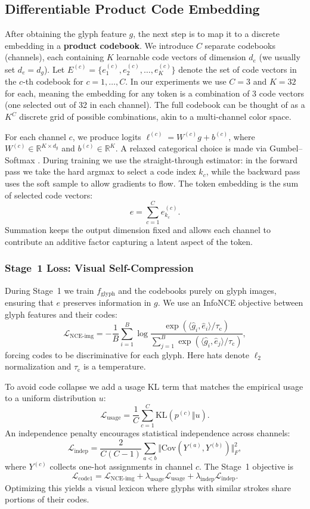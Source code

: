 \documentclass[10pt,twocolumn]{article}
\begin{document}
\subsection{Differentiable Product Code Embedding}\label{sec:product}
After obtaining the glyph feature $g$, the next step is to map it to a discrete embedding in a \textbf{product codebook}. We introduce $C$ separate codebooks (channels), each containing $K$ learnable code vectors of dimension $d_e$ (we usually set $d_e = d_g$). Let $E^{(c)} = \{e^{(c)}_{1}, e^{(c)}_{2}, \dots, e^{(c)}_{K}\}$ denote the set of code vectors in the $c$-th codebook for $c=1,\dots,C$. In our experiments we use $C=3$ and $K=32$ for each, meaning the embedding for any token is a combination of 3 code vectors (one selected out of 32 in each channel). The full codebook can be thought of as a $K^C$ discrete grid of possible combinations, akin to a multi-channel color space.

For each channel $c$, we produce logits $\ell^{(c)} = W^{(c)} g + b^{(c)}$, where $W^{(c)} \in \mathbb{R}^{K \times d_g}$ and $b^{(c)}\in\mathbb{R}^K$. A relaxed categorical choice is made via Gumbel--Softmax \citep{jang2017gumbel}. During training we use the straight-through estimator: in the forward pass we take the hard argmax to select a code index $k_c$, while the backward pass uses the soft sample to allow gradients to flow. The token embedding is the sum of selected code vectors:
\[
    e = \sum_{c=1}^C e^{(c)}_{k_c}.
\]
Summation keeps the output dimension fixed and allows each channel to contribute an additive factor capturing a latent aspect of the token.

\subsubsection{Stage~1 Loss: Visual Self-Compression}
During Stage~1 we train $f_{\text{glyph}}$ and the codebooks purely on glyph images, ensuring that $e$ preserves information in $g$. We use an InfoNCE objective between glyph features and their codes:
\[
    \mathcal{L}_{\text{NCE-img}} = -\frac{1}{B}\sum_{i=1}^B \log \frac{\exp(\langle \hat g_i, \hat e_i\rangle / \tau_{\text{c}})}{\sum_{j=1}^B \exp(\langle \hat g_i, \hat e_j\rangle / \tau_{\text{c}})},
\]
forcing codes to be discriminative for each glyph. Here hats denote $\ell_2$ normalization and $\tau_{\text{c}}$ is a temperature.

To avoid code collapse we add a usage KL term that matches the empirical usage to a uniform distribution $u$:
\[
    \mathcal{L}_{\text{usage}} = \frac{1}{C}\sum_{c=1}^C \mathrm{KL}(p^{(c)} \Vert u).
\]
An independence penalty encourages statistical independence across channels:
\[
    \mathcal{L}_{\text{indep}} = \frac{2}{C(C-1)}\sum_{a<b} \Vert \mathrm{Cov}(Y^{(a)}, Y^{(b)})\Vert_F^2,
\]
where $Y^{(c)}$ collects one-hot assignments in channel $c$. The Stage~1 objective is
\begin{equation}
    \mathcal{L}_{\text{code1}} = \mathcal{L}_{\text{NCE-img}} + \lambda_{\text{usage}} \mathcal{L}_{\text{usage}} + \lambda_{\text{indep}} \mathcal{L}_{\text{indep}}.
\end{equation}
Optimizing this yields a visual lexicon where glyphs with similar strokes share portions of their codes.
\end{document}
